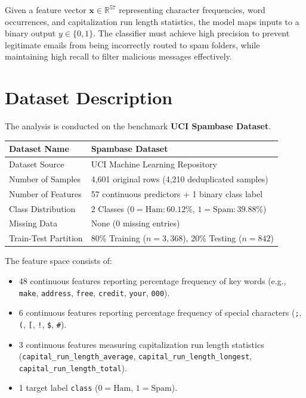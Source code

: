 \documentclass[12pt,a4paper]{article}
\begin{document}
Given a feature vector $\mathbf{x} \in \mathbb{R}^{57}$ representing character frequencies, word occurrences, and capitalization run length statistics, the model maps inputs to a binary output $y \in \{0, 1\}$. The classifier must achieve high precision to prevent legitimate emails from being incorrectly routed to spam folders, while maintaining high recall to filter malicious messages effectively.

\section{Dataset Description}
The analysis is conducted on the benchmark \textbf{UCI Spambase Dataset}.

\begin{longtable}{|p{6cm}|p{8cm}|}
\hline
Dataset Name & Spambase Dataset \\ \hline
Dataset Source & UCI Machine Learning Repository \\ \hline
Number of Samples & 4,601 original rows (4,210 deduplicated samples) \\ \hline
Number of Features & 57 continuous predictors + 1 binary class label \\ \hline
Class Distribution & 2 Classes ($0 = \text{Ham}: 60.12\%$, $1 = \text{Spam}: 39.88\%$) \\ \hline
Missing Data & None (0 missing entries) \\ \hline
Train-Test Partition & 80\% Training ($n=3,368$), 20\% Testing ($n=842$) \\ \hline
\end{longtable}

The feature space consists of:
\begin{itemize}[noitemsep]
    \item 48 continuous features reporting percentage frequency of key words (e.g., \texttt{make}, \texttt{address}, \texttt{free}, \texttt{credit}, \texttt{your}, \texttt{000}).
    \item 6 continuous features reporting percentage frequency of special characters (\texttt{;}, \texttt{(}, \texttt{[}, \texttt{!}, \texttt{\$}, \texttt{\#}).
    \item 3 continuous features measuring capitalization run length statistics (\texttt{capital\_run\_length\_average}, \texttt{capital\_run\_length\_longest}, \texttt{capital\_run\_length\_total}).
    \item 1 target label \texttt{class} ($0 = \text{Ham}$, $1 = \text{Spam}$).
\end{itemize}
\end{document}
